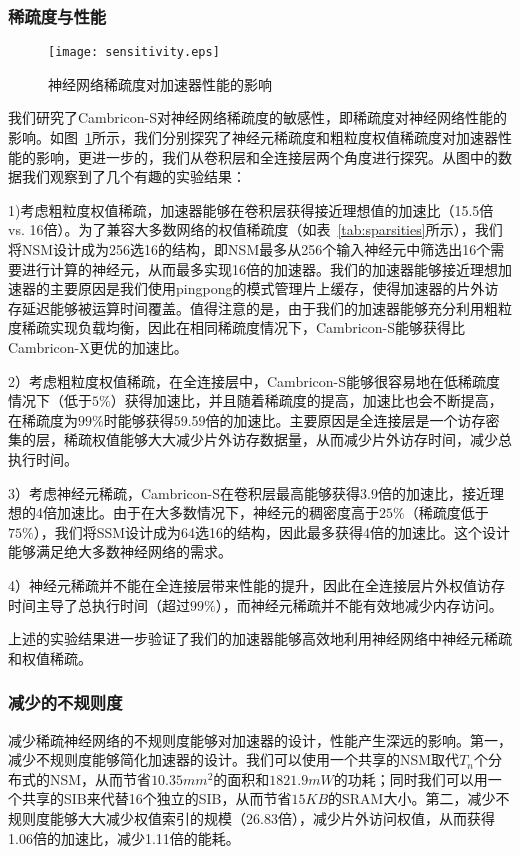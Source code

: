 \subsubsection{稀疏度与性能}
\begin{figure}[h]
\centering
\texttt{[image: sensitivity.eps]}
\caption{神经网络稀疏度对加速器性能的影响}
\label{fig:sensitivity}
\end{figure}

我们研究了Cambricon-S对神经网络稀疏度的敏感性，即稀疏度对神经网络性能的影响。如图~\ref{fig:sensitivity}所示，我们分别探究了神经元稀疏度和粗粒度权值稀疏度对加速器性能的影响，更进一步的，我们从卷积层和全连接层两个角度进行探究。从图中的数据我们观察到了几个有趣的实验结果：

1)考虑粗粒度权值稀疏，加速器能够在卷积层获得接近理想值的加速比（15.5倍 vs. 16倍）。为了兼容大多数网络的权值稀疏度（如表~\ref{tab:sparsities}所示），我们将NSM设计成为256选16的结构，即NSM最多从256个输入神经元中筛选出16个需要进行计算的神经元，从而最多实现16倍的加速器。我们的加速器能够接近理想加速器的主要原因是我们使用pingpong的模式管理片上缓存，使得加速器的片外访存延迟能够被运算时间覆盖。值得注意的是，由于我们的加速器能够充分利用粗粒度稀疏实现负载均衡，因此在相同稀疏度情况下，Cambricon-S能够获得比Cambricon-X更优的加速比。

2）考虑粗粒度权值稀疏，在全连接层中，Cambricon-S能够很容易地在低稀疏度情况下（低于$5\%$）获得加速比，并且随着稀疏度的提高，加速比也会不断提高，在稀疏度为$99\%$时能够获得59.59倍的加速比。主要原因是全连接层是一个访存密集的层，稀疏权值能够大大减少片外访存数据量，从而减少片外访存时间，减少总执行时间。

3）考虑神经元稀疏，Cambricon-S在卷积层最高能够获得3.9倍的加速比，接近理想的4倍加速比。由于在大多数情况下，神经元的稠密度高于$25\%$（稀疏度低于$75\%$），我们将SSM设计成为64选16的结构，因此最多获得4倍的加速比。这个设计能够满足绝大多数神经网络的需求。

4）神经元稀疏并不能在全连接层带来性能的提升，因此在全连接层片外权值访存时间主导了总执行时间（超过$99\%$），而神经元稀疏并不能有效地减少内存访问。

上述的实验结果进一步验证了我们的加速器能够高效地利用神经网络中神经元稀疏和权值稀疏。

\subsubsection{减少的不规则度}
减少稀疏神经网络的不规则度能够对加速器的设计，性能产生深远的影响。第一，减少不规则度能够简化加速器的设计。我们可以使用一个共享的NSM取代$T_n$个分布式的NSM，从而节省$10.35mm^2$的面积和$1821.9mW$的功耗；同时我们可以用一个共享的SIB来代替16个独立的SIB，从而节省$15KB$的SRAM大小。第二，减少不规则度能够大大减少权值索引的规模（26.83倍），减少片外访问权值，从而获得1.06倍的加速比，减少1.11倍的能耗。

